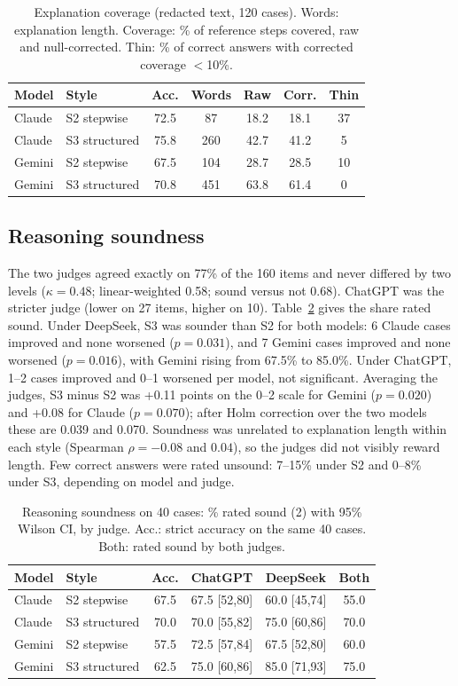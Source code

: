 \IfFileExists{IEEEtran.cls}{\ieeetrue\documentclass[conference]{IEEEtran}}{\ieeefalse\documentclass[10pt,twocolumn,letterpaper]{article}}
\begin{document}
\begin{table}[t]
\centering\caption{Explanation coverage (redacted text, 120 cases). Words: explanation length. Coverage: \% of reference steps covered, raw and null-corrected. Thin: \% of correct answers with corrected coverage $<$10\%.}\label{tab:cov}
\footnotesize
\begin{tabular}{@{}llccccc@{}}
\toprule
Model & Style & Acc. & Words & Raw & Corr. & Thin\\
\midrule
Claude & S2 stepwise & 72.5 & 87 & 18.2 & 18.1 & 37\\
Claude & S3 structured & 75.8 & 260 & 42.7 & 41.2 & 5\\
\midrule
Gemini & S2 stepwise & 67.5 & 104 & 28.7 & 28.5 & 10\\
Gemini & S3 structured & 70.8 & 451 & 63.8 & 61.4 & 0\\
\bottomrule
\end{tabular}
\end{table}

\subsection{Reasoning soundness}
The two judges agreed exactly on 77\% of the 160 items and never differed by two levels ($\kappa=0.48$; linear-weighted 0.58; sound versus not 0.68). ChatGPT was the stricter judge (lower on 27 items, higher on 10). Table~\ref{tab:snd} gives the share rated sound. Under DeepSeek, S3 was sounder than S2 for both models: 6 Claude cases improved and none worsened ($p=0.031$), and 7 Gemini cases improved and none worsened ($p=0.016$), with Gemini rising from 67.5\% to 85.0\%. Under ChatGPT, 1--2 cases improved and 0--1 worsened per model, not significant. Averaging the judges, S3 minus S2 was +0.11 points on the 0--2 scale for Gemini ($p=0.020$) and +0.08 for Claude ($p=0.070$); after Holm correction over the two models these are 0.039 and 0.070. Soundness was unrelated to explanation length within each style (Spearman $\rho=-0.08$ and $0.04$), so the judges did not visibly reward length. Few correct answers were rated unsound: 7--15\% under S2 and 0--8\% under S3, depending on model and judge. %

\begin{table}[t]
\centering\caption{Reasoning soundness on 40 cases: \% rated sound (2) with 95\% Wilson CI, by judge. Acc.: strict accuracy on the same 40 cases. Both: rated sound by both judges.}\label{tab:snd}
\footnotesize\setlength{\tabcolsep}{2.4pt}
\begin{tabular}{@{}llcccc@{}}
\toprule
Model & Style & Acc. & ChatGPT & DeepSeek & Both\\
\midrule
Claude & S2 stepwise & 67.5 & 67.5 [52,80] & 60.0 [45,74] & 55.0\\
Claude & S3 structured & 70.0 & 70.0 [55,82] & 75.0 [60,86] & 70.0\\
\midrule
Gemini & S2 stepwise & 57.5 & 72.5 [57,84] & 67.5 [52,80] & 60.0\\
Gemini & S3 structured & 62.5 & 75.0 [60,86] & 85.0 [71,93] & 75.0\\
\bottomrule
\end{tabular}
\end{table}
\end{document}

